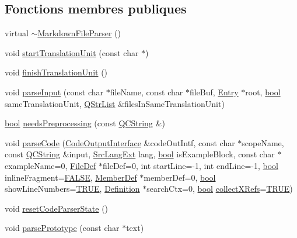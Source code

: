 \subsection*{Fonctions membres publiques}
\begin{DoxyCompactItemize}
\item 
virtual \hyperlink{class_markdown_file_parser_af36dd2db1637353038855681c5abce49}{$\sim$\+Markdown\+File\+Parser} ()
\item 
void \hyperlink{class_markdown_file_parser_a82d0d8fad0f6772a9862eb3d9190127d}{start\+Translation\+Unit} (const char $\ast$)
\item 
void \hyperlink{class_markdown_file_parser_adaf4aeedc27abe4dd8cc4a58d59b298f}{finish\+Translation\+Unit} ()
\item 
void \hyperlink{class_markdown_file_parser_a56e4994924ce8ac7710e2a1da0f98807}{parse\+Input} (const char $\ast$file\+Name, const char $\ast$file\+Buf, \hyperlink{class_entry}{Entry} $\ast$root, \hyperlink{qglobal_8h_a1062901a7428fdd9c7f180f5e01ea056}{bool} same\+Translation\+Unit, \hyperlink{class_q_str_list}{Q\+Str\+List} \&files\+In\+Same\+Translation\+Unit)
\item 
\hyperlink{qglobal_8h_a1062901a7428fdd9c7f180f5e01ea056}{bool} \hyperlink{class_markdown_file_parser_ae53b811156b426b03f4ea8f634141133}{needs\+Preprocessing} (const \hyperlink{class_q_c_string}{Q\+C\+String} \&)
\item 
void \hyperlink{class_markdown_file_parser_a4413366ce7b6f7e41a2b232ce2ad6170}{parse\+Code} (\hyperlink{class_code_output_interface}{Code\+Output\+Interface} \&code\+Out\+Intf, const char $\ast$scope\+Name, const \hyperlink{class_q_c_string}{Q\+C\+String} \&input, \hyperlink{types_8h_a9974623ce72fc23df5d64426b9178bf2}{Src\+Lang\+Ext} lang, \hyperlink{qglobal_8h_a1062901a7428fdd9c7f180f5e01ea056}{bool} is\+Example\+Block, const char $\ast$example\+Name=0, \hyperlink{class_file_def}{File\+Def} $\ast$file\+Def=0, int start\+Line=-\/1, int end\+Line=-\/1, \hyperlink{qglobal_8h_a1062901a7428fdd9c7f180f5e01ea056}{bool} inline\+Fragment=\hyperlink{qglobal_8h_a10e004b6916e78ff4ea8379be80b80cc}{F\+A\+L\+S\+E}, \hyperlink{class_member_def}{Member\+Def} $\ast$member\+Def=0, \hyperlink{qglobal_8h_a1062901a7428fdd9c7f180f5e01ea056}{bool} show\+Line\+Numbers=\hyperlink{qglobal_8h_a04a6422a52070f0dc478693da640242b}{T\+R\+U\+E}, \hyperlink{class_definition}{Definition} $\ast$search\+Ctx=0, \hyperlink{qglobal_8h_a1062901a7428fdd9c7f180f5e01ea056}{bool} \hyperlink{tclscanner_8cpp_ac23b94d6976d5bb0c9f1885c5a2e7a53}{collect\+X\+Refs}=\hyperlink{qglobal_8h_a04a6422a52070f0dc478693da640242b}{T\+R\+U\+E})
\item 
void \hyperlink{class_markdown_file_parser_a78b5337fc2b6a6dd1ee5ce104005e566}{reset\+Code\+Parser\+State} ()
\item 
void \hyperlink{class_markdown_file_parser_a5579fefcfe5512e79abfe55fd508fc95}{parse\+Prototype} (const char $\ast$text)
\end{DoxyCompactItemize}


